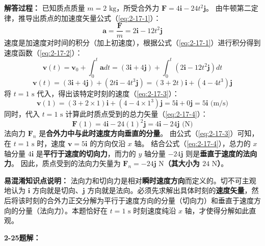 \textbf{解答过程：}
已知质点质量 $m = 2\text{ kg}$，所受合外力 $\mathbf{F} = 4\mathbf{i} - 24t^2\mathbf{j}$。
由牛顿第二定律，推导出质点的加速度矢量公式（\ref{eq:2-17-1}）：
\begin{equation}\label{eq:2-17-1}
	\mathbf{a} = \frac{\mathbf{F}}{m} = 2\mathbf{i} - 12t^2\mathbf{j}
\end{equation}
速度是加速度对时间的积分（加上初速度），根据公式（\ref{eq:2-17-1}）进行积分得到速度函数（\ref{eq:2-17-2}）：
\begin{equation}\label{eq:2-17-2}
	\mathbf{v}(t) = \mathbf{v}_0 + \int_{0}^{t} \mathbf{a} dt = (3\mathbf{i} + 4\mathbf{j}) + \int_{0}^{t} (2\mathbf{i} - 12t^2\mathbf{j}) dt
\end{equation}
$$\mathbf{v}(t) = (3\mathbf{i} + 4\mathbf{j}) + (2t\mathbf{i} - 4t^3\mathbf{j}) = (3 + 2t)\mathbf{i} + (4 - 4t^3)\mathbf{j}$$
将 $t = 1\text{ s}$ 代入，得出该特定时刻的速度（\ref{eq:2-17-3}）：
\begin{equation}\label{eq:2-17-3}
	\mathbf{v}(1) = (3 + 2 \times 1)\mathbf{i} + (4 - 4 \times 1^3)\mathbf{j} = 5\mathbf{i} + 0\mathbf{j} = 5\mathbf{i}\text{ (m/s)}
\end{equation}
同时，代入 $t = 1\text{ s}$ 计算此时质点受到的总力矢量（\ref{eq:2-17-4}）：
\begin{equation}\label{eq:2-17-4}
	\mathbf{F}(1) = 4\mathbf{i} - 24(1)^2\mathbf{j} = 4\mathbf{i} - 24\mathbf{j}\text{ (N)}
\end{equation}
法向力 $\mathbf{F}_n$ 是\textbf{合外力中与此时速度方向垂直的分量}。
由公式（\ref{eq:2-17-3}）可知，在 $t = 1\text{ s}$ 时，速度 $\mathbf{v} = 5\mathbf{i}$ 的方向仅沿 $x$ 轴。
结合公式（\ref{eq:2-17-4}），总力的 $x$ 轴分量 $4\mathbf{i}$ 是\textbf{平行于速度的切向力}，而力的 $y$ 轴分量 $-24\mathbf{j}$ 则是\textbf{垂直于速度的法向力}。
因此，质点受到的法向力矢量为 $\mathbf{F}_n = -24\mathbf{j}\text{ N}$\textbf{（其大小为 $24\text{ N}$）}。

\textbf{易混淆知识点说明：}
法向力和切向力是相对\textbf{瞬时速度方向}而定义的。切不可主观地认为 $\mathbf{i}$ 方向就是切向、$\mathbf{j}$ 方向就是法向。必须先求解出具体时刻的\textbf{速度矢量}，然后将该时刻的合外力正交分解为平行于速度方向的分量（切向力）和垂直于速度方向的分量（法向力）。本题恰好在 $t=1\text{ s}$ 时刻速度纯沿 $x$ 轴，才使得分解如此直观。

\vspace{2em}

\textbf{2-25题解：}
\setcounter{equation}{0}
\renewcommand{\theHequation}{2-25.\arabic{equation}}

